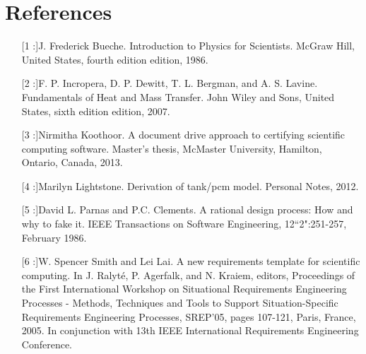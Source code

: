 \documentclass[12pt]{article}
\begin{document}
\section{References}
\label{Sec:Refe}
\begin{itemize}
\item[[1]:]J. Frederick Bueche. Introduction to Physics for Scientists. McGraw Hill, United States, fourth edition edition, 1986.
\item[[2]:]F. P. Incropera, D. P. Dewitt, T. L. Bergman, and A. S. Lavine. Fundamentals of Heat and Mass Transfer. John Wiley and Sons, United States, sixth edition edition, 2007.
\item[[3]:]Nirmitha Koothoor. A document drive approach to certifying scientific computing software. Master's thesis, McMaster University, Hamilton, Ontario, Canada, 2013.
\item[[4]:]Marilyn Lightstone. Derivation of tank/pcm model. Personal Notes, 2012.
\item[[5]:]David L. Parnas and P.C. Clements. A rational design process: How and why to fake it. IEEE Transactions on Software Engineering, 12``2":251-257, February 1986.
\item[[6]:]W. Spencer Smith and Lei Lai. A new requirements template for scientific computing. In J. Ralyt\'{e}, P. Agerfalk, and N. Kraiem, editors, Proceedings of the First International Workshop on Situational Requirements Engineering Processes - Methods, Techniques and Tools to Support Situation-Specific Requirements Engineering Processes, SREP'05, pages 107-121, Paris, France, 2005. In conjunction with 13th IEEE International Requirements Engineering Conference.
\end{itemize}
\end{document}
